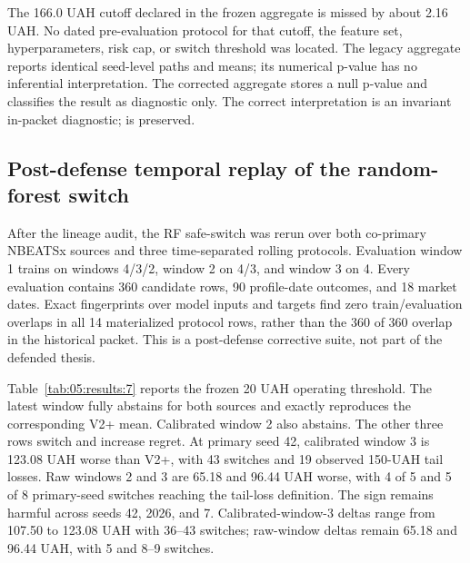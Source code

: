 The 166.0 UAH cutoff declared in the frozen aggregate is missed by about 2.16 UAH. No dated pre-evaluation protocol for that cutoff, the feature set, hyperparameters, risk cap, or switch threshold was located. The legacy aggregate reports identical seed-level paths and means; its numerical p-value has no inferential interpretation. The corrected aggregate stores a null p-value and classifies the result as diagnostic only. The correct interpretation is an invariant in-packet diagnostic;  is preserved.

\subsection{Post-defense temporal replay of the random-forest switch}

After the lineage audit, the RF safe-switch was rerun over both co-primary NBEATSx sources and three time-separated rolling protocols. Evaluation window 1 trains on windows 4/3/2, window 2 on 4/3, and window 3 on 4. Every evaluation contains 360 candidate rows, 90 profile-date outcomes, and 18 market dates. Exact fingerprints over model inputs and targets find zero train/evaluation overlaps in all 14 materialized protocol rows, rather than the 360 of 360 overlap in the historical packet. This is a post-defense corrective suite, not part of the defended thesis.

Table~\ref{tab:05:results:7} reports the frozen 20 UAH operating threshold. The latest window fully abstains for both sources and exactly reproduces the corresponding V2+ mean. Calibrated window 2 also abstains. The other three rows switch and increase regret. At primary seed 42, calibrated window 3 is 123.08 UAH worse than V2+, with 43 switches and 19 observed 150-UAH tail losses. Raw windows 2 and 3 are 65.18 and 96.44 UAH worse, with 4 of 5 and 5 of 8 primary-seed switches reaching the tail-loss definition. The sign remains harmful across seeds 42, 2026, and 7. Calibrated-window-3 deltas range from 107.50 to 123.08 UAH with 36--43 switches; raw-window deltas remain 65.18 and 96.44 UAH, with 5 and 8--9 switches.

